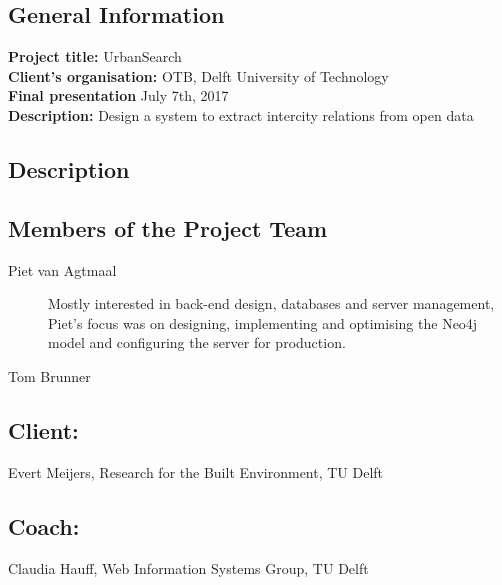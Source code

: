 \documentclass{article}
\begin{document}
\titlespacing{\section}{0pt}{\baselineskip}{0pt}
\titlespacing{\subsection}{0pt}{0pt}{0pt}
\titlespacing{\subsubsection}{0pt}{0pt}{0pt}
\fontsize{11pt}{12pt}
\noindent

\noindent
\subsection*{General Information}

\noindent\textbf{Project title:} UrbanSearch\\
\textbf{Client's organisation:} OTB, Delft University of Technology\\
\textbf{Final presentation} July 7th, 2017\\
\textbf{Description:} Design a system to extract intercity relations from open data

\subsection*{Description}

\subsection*{Members of the Project Team}
\begin{description}
\item[Piet van Agtmaal] Mostly interested in back-end design, databases and server management, Piet's focus was on designing, implementing and optimising the Neo4j model and configuring the server for production.
\item[Tom Brunner]
\end{description}

\subsection*{Client:}
Evert Meijers, Research for the Built Environment, TU Delft

\subsection*{Coach:}
Claudia Hauff, Web Information Systems Group, TU Delft
\end{document}

